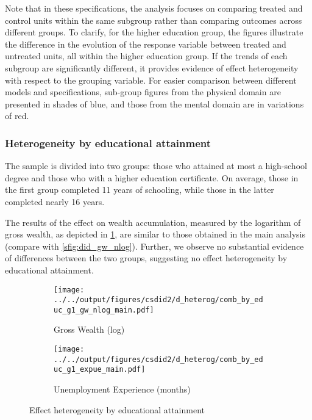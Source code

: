 Note that in these specifications, the analysis focuses on comparing treated and control units within the same
subgroup rather than comparing outcomes across different groups. To clarify, for the higher education group,
the figures illustrate the difference in the evolution of the response variable between treated and untreated
units, all within the higher education group. If the trends of each subgroup are significantly different, it
provides evidence of effect heterogeneity with respect to the grouping variable. For easier comparison between
different models and specifications, sub-group figures from the physical domain are presented in shades of
blue, and those from the mental domain are in variations of red.


\subsubsection{Heterogeneity by educational attainment}

The sample is divided into two groups: those who attained at most a high-school degree and those who with a
higher education certificate. On average, those in the first group completed 11 years of schooling, while those
in the latter completed nearly 16 years.

The results of the effect on wealth accumulation, measured by the logarithm of gross wealth, as depicted in
\cref{sfig:by_educ_g1_main_gw_nlog}, are similar to those obtained in the main analysis (compare with
\cref{sfig:did_gw_nlog}). Further, we observe no substantial evidence of differences between the two groups,
suggesting no effect heterogeneity by educational attainment.

\begin{figure}[tb!]
    \centering
    \begin{subfigure}{0.9\textwidth}
        \caption{Gross Wealth (log)}
        \label{sfig:by_educ_g1_main_gw_nlog}
        \texttt{[image: ../../output/figures/csdid2/d\_heterog/comb\_by\_educ\_g1\_gw\_nlog\_main.pdf]}
    \end{subfigure}
    \begin{subfigure}{0.9\textwidth}
        \caption{Unemployment Experience (months)}
        \label{sfig:by_educ_g1_main_expue}
        \texttt{[image: ../../output/figures/csdid2/d\_heterog/comb\_by\_educ\_g1\_expue\_main.pdf]}
    \end{subfigure}
    \caption{Effect heterogeneity by educational attainment}
    \label{fig:heterog_educ}
\end{figure}




